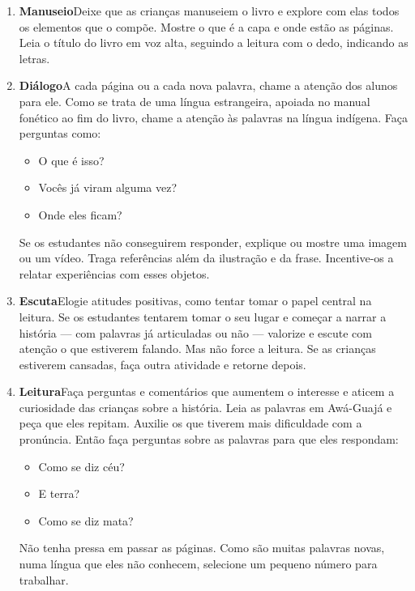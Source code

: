 \documentclass[11pt]{extarticle}
\begin{document}
{{\begin{enumerate}
\item \textbf{Manuseio}\quad Deixe que as crianças manuseiem o livro 
e explore com elas todos os elementos que o compõe. Mostre o que é a 
capa e onde estão as páginas. Leia o título do livro em voz alta, seguindo 
a leitura com o dedo, indicando as letras. 

\item \textbf{Diálogo}\quad A cada página ou a cada nova palavra,
chame a atenção dos alunos para ele. Como se trata de uma língua estrangeira, 
apoiada no manual fonético ao fim do livro, chame a atenção às palavras na língua 
indígena. Faça perguntas como:

\begin{itemize}
\item O que é isso?
\item Vocês já viram alguma vez? 
\item Onde eles ficam? 
\end{itemize}

Se os estudantes não conseguirem responder, explique ou mostre uma 
imagem ou um vídeo. Traga referências além da ilustração e da frase. 
Incentive-os a relatar experiências com esses objetos.

\item \textbf{Escuta}\quad Elogie atitudes positivas, como 
tentar tomar o papel central na leitura. Se os estudantes tentarem 
tomar o seu lugar e começar a narrar a história --- com palavras já articuladas 
ou não --- valorize e escute com atenção o que estiverem falando. Mas não 
force a leitura. Se as crianças estiverem cansadas, faça outra atividade 
e retorne depois. 

\item \textbf{Leitura}\quad Faça perguntas e comentários que aumentem o 
interesse e aticem a curiosidade das crianças sobre a história. Leia 
as palavras em Awá-Guajá e peça que eles repitam. Auxilie os que tiverem
mais dificuldade com a pronúncia. Então faça perguntas sobre as palavras
para que eles respondam:

\begin{itemize}
\item Como se diz céu?
\item E terra?
\item Como se diz mata?
\end{itemize}

Não tenha pressa em passar as páginas. Como são muitas palavras novas,
numa língua que eles não conhecem, selecione um pequeno número para
trabalhar. 


\end{enumerate}}}
\end{document}

